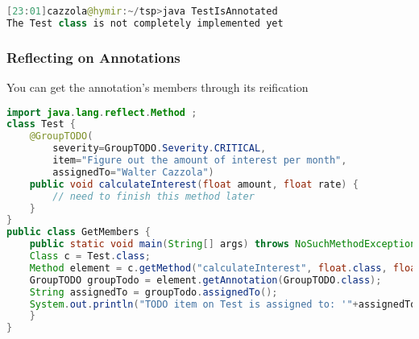 \begin{lstlisting}[language=Java]
[23:01]cazzola@hymir:~/tsp>java TestIsAnnotated
The Test class is not completely implemented yet
\end{lstlisting}

\subsubsection{Reflecting on Annotations}

You can get the annotation’s members through its reification

\begin{lstlisting}[language=Java]
import java.lang.reflect.Method ;
class Test {
	@GroupTODO(
		severity=GroupTODO.Severity.CRITICAL,
		item="Figure out the amount of interest per month",
		assignedTo="Walter Cazzola")
	public void calculateInterest(float amount, float rate) {
		// need to finish this method later
	}
}
public class GetMembers {
	public static void main(String[] args) throws NoSuchMethodException {
	Class c = Test.class;
	Method element = c.getMethod("calculateInterest", float.class, float.class);
	GroupTODO groupTodo = element.getAnnotation(GroupTODO.class);
	String assignedTo = groupTodo.assignedTo();
	System.out.println("TODO item on Test is assigned to: '"+assignedTo+"'.");
	}
}
\end{lstlisting}
